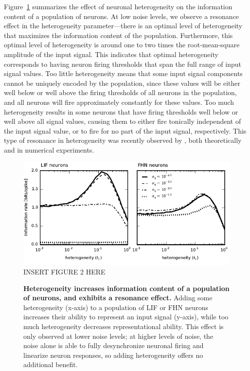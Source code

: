 \documentclass[12pt]{article}
\begin{document}
Figure~\ref{fig:infohetero} summarizes the effect of neuronal heterogeneity on the information content of a population of neurons. At low noise levels, we observe a resonance effect in the heterogeneity parameter---there is an optimal level of heterogeneity that maximizes the information content of the population. Furthermore, this optimal level of heterogeneity is around one to two times the root-mean-square amplitude of the input signal. This indicates that optimal heterogeneity corresponds to having neuron firing thresholds that span the full range of input signal values. Too little heterogeneity means that some input signal components cannot be uniquely encoded by the population, since these values will be either well below or well above the firing thresholds of all neurons in the population, and all neurons will fire approximately constantly for these values. Too much heterogeneity results in some neurons that have firing thresholds well below or well above all signal values, causing them to either fire tonically independent of the input signal value, or to fire for no part of the input signal, respectively. This type of resonance in heterogeneity was recently observed by \cite{Mejias2012}, both theoretically and in numerical experiments.

\begin{figure}
  \ifx\hidefigures\undefined
    \centering
    \includegraphics[width=\textwidth]{figure2_infohetero.pdf}
  \else
    INSERT FIGURE 2 HERE
  \fi
  \caption{
    \textbf{Heterogeneity increases information content of a population of neurons, and exhibits a resonance effect.}
    Adding some heterogeneity (x-axis) to a population of LIF or FHN neurons increases their ability to represent an input signal (y-axis), while too much heterogeneity decreases representational ability. This effect is only observed at lower noise levels; at higher levels of noise, the noise alone is able to fully desynchronize neuronal firing and linearize neuron responses, so adding heterogeneity offers no additional benefit.
  }
  \label{fig:infohetero}
\end{figure}
\end{document}
